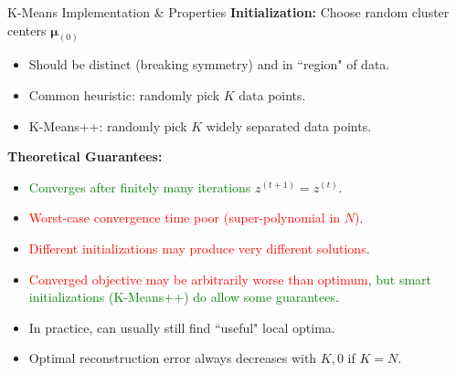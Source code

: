 \documentclass[10pt,mathserif]{beamer}
\begin{document}
\begin{frame}{K-Means Implementation \& Properties}
\textbf{Initialization:} Choose random cluster centers $\bm{\mu}_{(0)}$
\begin{itemize}
    \item Should be distinct (breaking symmetry) and in ``region" of data.
    \item Common heuristic: randomly pick $K$ data points.
    \item K-Means++: randomly pick $K$ widely separated data points.
\end{itemize}
\textbf{Theoretical Guarantees:}
\begin{itemize}
    \item \textcolor{green}{Converges after finitely many iterations} $z^{(t+1)} = z^{(t)}$.
    \item \textcolor{red}{Worst-case convergence time poor (super-polynomial in $N$)}.
    \item \textcolor{red}{Different initializations may produce very different solutions}.
    \item \textcolor{red}{Converged objective may be arbitrarily worse than optimum}, \textcolor{green}{but smart initializations (K-Means++) do allow some guarantees}.
    \item In practice, can usually still find ``useful" local optima.
    \item Optimal reconstruction error always decreases with $K, 0$ if $K=N$.
\end{itemize}
\end{frame}
\end{document}
